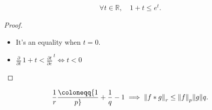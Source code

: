 \begin{proposition}

\begin{align*}  
\forall t\in {\mathbb{R}},\quad 1 + t \leq  e^t
.\end{align*}

\end{proposition}

\begin{proof}

\envlist

\begin{itemize}
\tightlist
\item
  It's an equality when \(t=0\).
\item
  \({\frac{\partial }{\partial t}\,} 1+ t < {\frac{\partial t}{\partial e}\,}^t \iff t<0\)
\end{itemize}

\end{proof}

\begin{proposition}

\begin{align*}
{1\over r} \coloneqq{1\over p} + {1\over q} - 1 \implies {\left\lVert {f \ast g} \right\rVert}_{r} \leq {\left\lVert {f} \right\rVert}_{p} {\left\lVert {g} \right\rVert}{q}
.\end{align*}

\end{proposition}


\printbibliography[title=Bibliography]



